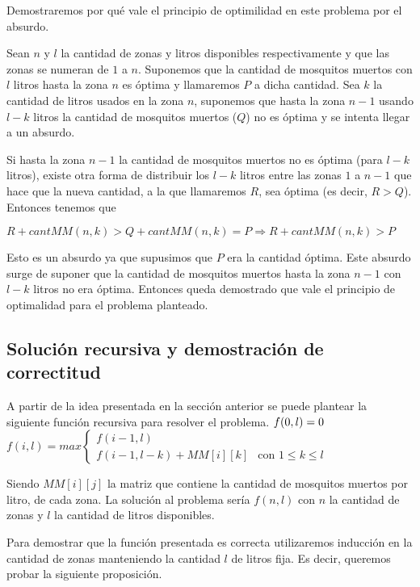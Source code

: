 \documentclass[a4paper,11pt] {article}
\begin{document}
Demostraremos por qu\'e vale el principio de optimilidad en este problema por el absurdo.

Sean $n$ y $l$ la cantidad de zonas y litros disponibles respectivamente y que las zonas se numeran de $1$ a $n$. Suponemos que la cantidad de mosquitos muertos con $l$ litros hasta la zona $n$ es \'optima y llamaremos $P$ a dicha cantidad. Sea $k$ la cantidad de litros usados en la zona $n$, suponemos que hasta la zona $n-1$ usando $l-k$ litros la cantidad de mosquitos muertos ($Q$) no es \'optima y se intenta llegar a un absurdo.

Si hasta la zona $n-1$ la cantidad de mosquitos muertos no es \'optima (para $l-k$ litros), existe otra forma de distribuir los $l-k$ litros entre las zonas $1$ a $n-1$ que hace que la nueva cantidad, a la que llamaremos $R$, sea \'optima (es decir, $R > Q$). Entonces tenemos que

$R + cantMM(n,k) > Q + cantMM(n,k) = P \Rightarrow R + cantMM(n,k) > P$

Esto es un absurdo ya que supusimos que $P$ era la cantidad \'optima. Este absurdo surge de suponer que la cantidad de mosquitos muertos hasta la zona $n-1$ con $l-k$ litros no era \'optima. Entonces queda demostrado que vale el principio de optimalidad para el problema planteado.

\subsection*{Soluci\'on recursiva y demostraci\'on de correctitud}

A partir de la idea presentada en la secci\'on anterior se puede plantear la siguiente funci\'on recursiva para resolver el problema.
$\\ f(0, l) = 0 \\$
$ f(i,l) = max \left\{ \begin{array}{ll}
         f(i-1,l) & \mbox{$$}\\
        f(i-1, l-k) + MM[i][k] & \mbox{con $1 \leq k \leq l$}\end{array} \right. $


Siendo $MM[i][j]$ la matriz que contiene la cantidad de mosquitos muertos por litro, de cada zona. La soluci\'on al problema ser\'ia $f(n,l)$ con $n$ la cantidad de zonas y $l$ la cantidad de litros disponibles.

Para demostrar que la funci\'on presentada es correcta utilizaremos inducci\'on en la cantidad de zonas manteniendo la cantidad $l$ de litros fija. Es decir, queremos probar la siguiente proposici\'on. \\
\end{document}
